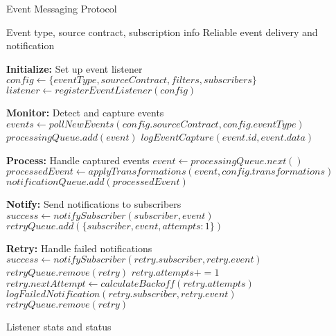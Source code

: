 
\begin{algorithm}
\caption{Event Messaging Protocol}
\label{alg:event}
\begin{algorithmic}[1]
\Require Event type, source contract, subscription info
\Ensure Reliable event delivery and notification

\State \textbf{Initialize:} Set up event listener
\State $config \gets \{eventType, sourceContract, filters, subscribers\}$
\State $listener \gets registerEventListener(config)$

\State \textbf{Monitor:} Detect and capture events
    \State $events \gets pollNewEvents(config.sourceContract, config.eventType)$
            \State $processingQueue.add(event)$
            \State $logEventCapture(event.id, event.data)$
        \EndIf
    \EndFor
    
    \State \textbf{Process:} Handle captured events
        \State $event \gets processingQueue.next()$
        \State $processedEvent \gets applyTransformations(event, config.transformations)$
        \State $notificationQueue.add(processedEvent)$
    \EndWhile
    
    \State \textbf{Notify:} Send notifications to subscribers
            \State $success \gets notifySubscriber(subscriber, event)$
                \State $retryQueue.add(\{subscriber, event, attempts: 1\})$
            \EndIf
        \EndFor
    \EndFor
    
    \State \textbf{Retry:} Handle failed notifications
                \State $success \gets notifySubscriber(retry.subscriber, retry.event)$
                    \State $retryQueue.remove(retry)$
                \Else
                    \State $retry.attempts += 1$
                    \State $retry.nextAttempt \gets calculateBackoff(retry.attempts)$
                \EndIf
            \Else
                \State $logFailedNotification(retry.subscriber, retry.event)$
                \State $retryQueue.remove(retry)$
            \EndIf
        \EndFor
    \EndIf
\EndWhile

\State \Return Listener stats and status
\end{algorithmic}
\end{algorithm} 
